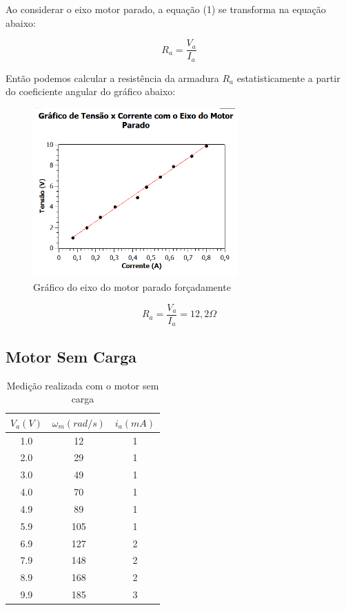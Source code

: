 \documentclass[12pt]{article}
\begin{document}
\quad Ao considerar o eixo motor parado, a equação (1) se transforma na equação abaixo:

\begin{equation}
    R_a = \frac{V_a}{I_a}
\end{equation}

\quad Então podemos calcular a resistência da armadura $R_a$ estatisticamente  a partir do coeficiente angular do gráfico abaixo:

\begin{figure}[H] %
    \centering
    \includegraphics[width = 0.7\textwidth]{GRÁFICO 01.png}
    \caption{Gráfico do eixo do motor parado forçadamente}
    \label{fig:mesh3}
\end{figure}

\begin{equation}
    R_a = \frac{V_a}{I_a} = 12,2 \Omega
\end{equation}

\subsection{Motor Sem Carga}
\begin{table}[H]
\centering
\begin{tabular}{c c c} 
 \hline
 $V_a(V)$ & $\omega_m(rad/s)$ & $i_a(mA)$ \\ 
 \hline
 1.0 & 12 & 1 \\ 
 2.0 & 29 & 1 \\
 3.0 & 49 & 1 \\
 4.0 & 70 & 1\\
 4.9 & 89 & 1\\
 5.9 & 105 & 1\\
 6.9 & 127 & 2\\
 7.9 & 148 & 2\\
 8.9 & 168 & 2\\
 9.9 & 185 & 3\\
 \hline
\end{tabular}
\caption{Medição realizada com o motor sem carga}
\label{table:data2}
\end{table}
\end{document}
